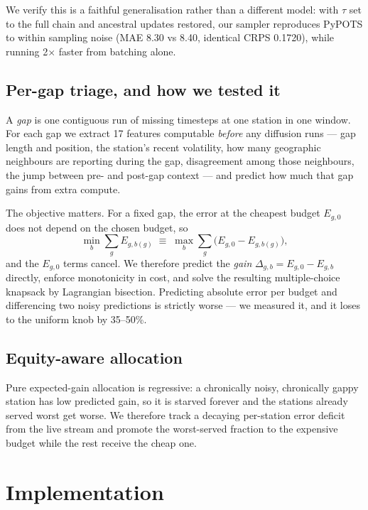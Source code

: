 \documentclass[conference]{IEEEtran}
\begin{document}
We verify this is a faithful generalisation rather than a different model: with
$\tau$ set to the full chain and ancestral updates restored, our sampler
reproduces PyPOTS to within sampling noise (MAE 8.30 vs 8.40, identical CRPS
0.1720), while running 2$\times$ faster from batching alone.

\subsection{Per-gap triage, and how we tested it}

A \emph{gap} is one contiguous run of missing timesteps at one station in one
window. For each gap we extract 17 features computable \emph{before} any
diffusion runs --- gap length and position, the station's recent volatility,
how many geographic neighbours are reporting during the gap, disagreement among
those neighbours, the jump between pre- and post-gap context --- and predict how
much that gap gains from extra compute.

The objective matters. For a fixed gap, the error at the cheapest budget $E_{g,0}$
does not depend on the chosen budget, so
\begin{equation}
\min_{b} \sum_g E_{g,b(g)} \;\equiv\; \max_{b} \sum_g \big(E_{g,0}-E_{g,b(g)}\big),
\label{eq:gain}
\end{equation}
and the $E_{g,0}$ terms cancel. We therefore predict the \emph{gain}
$\Delta_{g,b}=E_{g,0}-E_{g,b}$ directly, enforce monotonicity in cost, and solve
the resulting multiple-choice knapsack by Lagrangian bisection. Predicting
absolute error per budget and differencing two noisy predictions is strictly
worse --- we measured it, and it loses to the uniform knob by 35--50\%.

\subsection{Equity-aware allocation}

Pure expected-gain allocation is regressive: a chronically noisy, chronically
gappy station has low predicted gain, so it is starved forever and the stations
already served worst get worse. We therefore track a decaying per-station error
deficit from the live stream and promote the worst-served fraction to the
expensive budget while the rest receive the cheap one.

\section{Implementation}
\end{document}
